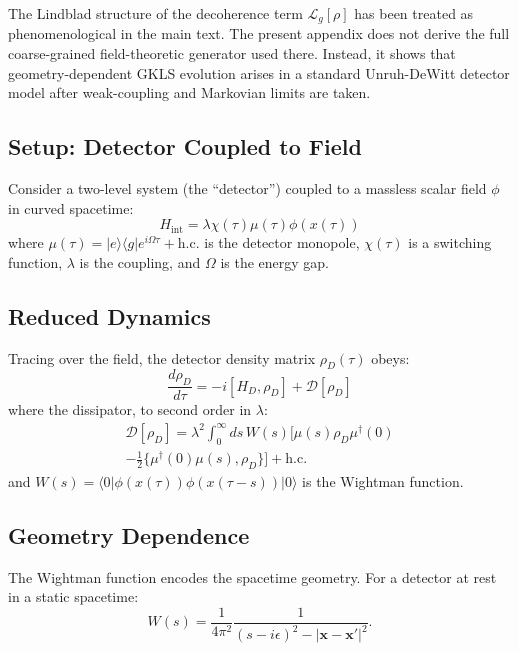 \documentclass[aps,prd,twocolumn,superscriptaddress,nofootinbib,floatfix]{revtex4-2}
\begin{document}
The Lindblad structure of the decoherence term $\mathcal{L}_g[\rho]$ has been treated as phenomenological in the main text. The present appendix does not derive the full coarse-grained field-theoretic generator used there. Instead, it shows that geometry-dependent GKLS evolution arises in a standard Unruh-DeWitt detector model after weak-coupling and Markovian limits are taken.

\subsection{Setup: Detector Coupled to Field}

Consider a two-level system (the ``detector'') coupled to a massless scalar field $\phi$ in curved spacetime:
\begin{equation}
    H_{\mathrm{int}} = \lambda \chi(\tau) \mu(\tau) \phi(x(\tau))
\end{equation}
where $\mu(\tau) = |e\rangle\langle g| e^{i\Omega\tau} + \mathrm{h.c.}$ is the detector monopole, $\chi(\tau)$ is a switching function, $\lambda$ is the coupling, and $\Omega$ is the energy gap.

\subsection{Reduced Dynamics}

Tracing over the field, the detector density matrix $\rho_D(\tau)$ obeys:
\begin{equation}
    \frac{d\rho_D}{d\tau} = -i[H_D, \rho_D] + \mathcal{D}[\rho_D]
\end{equation}
where the dissipator, to second order in $\lambda$:
\begin{multline}
    \mathcal{D}[\rho_D] = \lambda^2 \int_0^\infty ds \, W(s) \Big[ \mu(s) \rho_D \mu^\dagger(0) \\
    - \tfrac{1}{2} \{\mu^\dagger(0) \mu(s), \rho_D\} \Big] + \mathrm{h.c.}
\end{multline}
and $W(s) = \langle 0| \phi(x(\tau)) \phi(x(\tau-s)) |0\rangle$ is the Wightman function.

\subsection{Geometry Dependence}

The Wightman function encodes the spacetime geometry. For a detector at rest in a static spacetime:
\begin{equation}
    W(s) = \frac{1}{4\pi^2} \frac{1}{(s - i\epsilon)^2 - |\mathbf{x} - \mathbf{x}'|^2}.
\end{equation}
\end{document}
